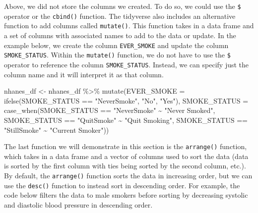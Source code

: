 \documentclass[
  letterpaper,
]{krantz}
\makeatletter
\newenvironment{Shaded}{\begin{snugshade}}{\end{snugshade}}
\newcommand{\AttributeTok}[1]{\textcolor[rgb]{0.40,0.45,0.13}{#1}}
\newcommand{\FunctionTok}[1]{\textcolor[rgb]{0.28,0.35,0.67}{#1}}
\newcommand{\NormalTok}[1]{\textcolor[rgb]{0.00,0.23,0.31}{#1}}
\newcommand{\OtherTok}[1]{\textcolor[rgb]{0.00,0.23,0.31}{#1}}
\newcommand{\SpecialCharTok}[1]{\textcolor[rgb]{0.37,0.37,0.37}{#1}}
\newcommand{\StringTok}[1]{\textcolor[rgb]{0.13,0.47,0.30}{#1}}
\newenvironment{kframe}{%
\medskip{}
\setlength{\fboxsep}{.8em}
 \def\at@end@of@kframe{}%
 \ifinner\ifhmode%
  \def\at@end@of@kframe{\end{minipage}}%
  \begin{minipage}{\columnwidth}%
 \fi\fi%
 \def\FrameCommand##1{\hskip\@totalleftmargin \hskip-\fboxsep
 \colorbox{shadecolor}{##1}\hskip-\fboxsep
     \hskip-\linewidth \hskip-\@totalleftmargin \hskip\columnwidth}%
 \MakeFramed {\advance\hsize-\width
   \@totalleftmargin\z@ \linewidth\hsize
   \@setminipage}}%
 {\par\unskip\endMakeFramed%
 \at@end@of@kframe}
\renewenvironment{Shaded}{\begin{kframe}}{\end{kframe}}
\makeatother
\begin{document}
Above, we did not store the columns we created. To do so, we could use
the \texttt{\$} operator or the \texttt{cbind()} function. The tidyverse
also includes an alternative function to add columns called
\texttt{mutate()}. This function takes in a data frame and a set of
columns with associated names to add to the data or update. In the
example below, we create the column \texttt{EVER\_SMOKE} and update the
column \texttt{SMOKE\_STATUS}. Within the \texttt{mutate()} function, we
do not have to use the \texttt{\$} operator to reference the column
\texttt{SMOKE\_STATUS}. Instead, we can specify just the column name and
it will interpret it as that column.

\begin{Shaded}
\begin{Highlighting}[]
\NormalTok{nhanes\_df }\OtherTok{\textless{}{-}}\NormalTok{ nhanes\_df }\SpecialCharTok{\%\textgreater{}\%} 
  \FunctionTok{mutate}\NormalTok{(}\AttributeTok{EVER\_SMOKE =} \FunctionTok{ifelse}\NormalTok{(SMOKE\_STATUS }\SpecialCharTok{==} \StringTok{"NeverSmoke"}\NormalTok{, }\StringTok{"No"}\NormalTok{, }\StringTok{"Yes"}\NormalTok{), }
         \AttributeTok{SMOKE\_STATUS =} \FunctionTok{case\_when}\NormalTok{(SMOKE\_STATUS }\SpecialCharTok{==} \StringTok{"NeverSmoke"} \SpecialCharTok{\textasciitilde{}} \StringTok{"Never Smoked"}\NormalTok{,}
\NormalTok{                                  SMOKE\_STATUS }\SpecialCharTok{==} \StringTok{"QuitSmoke"} \SpecialCharTok{\textasciitilde{}} \StringTok{"Quit Smoking"}\NormalTok{,}
\NormalTok{                                  SMOKE\_STATUS }\SpecialCharTok{==} \StringTok{"StillSmoke"} \SpecialCharTok{\textasciitilde{}} 
                                    \StringTok{"Current Smoker"}\NormalTok{)) }
\end{Highlighting}
\end{Shaded}

The last function we will demonstrate in this section is the
\texttt{arrange()} function, which takes in a data frame and a vector of
columns used to sort the data (data is sorted by the first column with
ties being sorted by the second column, etc.). By default, the
\texttt{arrange()} function sorts the data in increasing order, but we
can use the \texttt{desc()} function to instead sort in descending
order. For example, the code below filters the data to male smokers
before sorting by decreasing systolic and diastolic blood pressure in
descending order.
\end{document}
